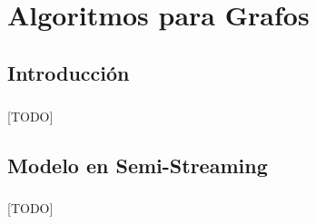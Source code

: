 \documentclass{subfiles}
\begin{document}
  \chapter{Algoritmos para Grafos}
  \label{chap:graphs}

    \section{Introducción}
    \label{sec:graphs_intro}

      \paragraph{}
      [TODO]

    \section{Modelo en Semi-Streaming}
    \label{sec:semi_streaming_model}

      \paragraph{}
      [TODO]
\end{document}
